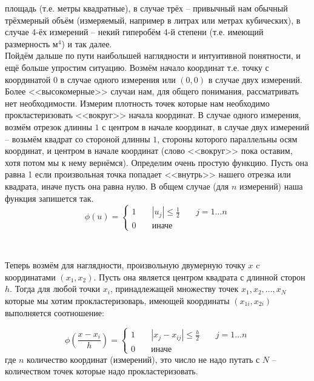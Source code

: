 \documentclass[11pt]{article}
\begin{document}
площадь (т.е. метры квадратные), в случае трёх -- привычный нам обычный
трёхмерный объём (измеряемый, например в литрах или метрах кубических),
в случае 4-ёх измерений -- некий гиперобём 4-й степени (т.е. имеющий
размерность ${\mbox{м}}^4$) и так далее. \\ Пойдём дальше
по пути наибольшей наглядности и интуитивной понятности, и ещё больше
упростим ситуацию. Возмём начало координат т.е. точку с координатой $0$
в случае одного измерения или $(0, 0)$ в случае двух измерений. Более
<<высокомерные>> случаи нам, для общего понимания, рассматривать
нет необходимости. Измерим плотность точек которые нам необходимо
прокластеризовать <<вокруг>> начала координат. В случае одного
измерения, возмём отрезок длинны $1$ с центром в начале координат, в
случае двух измерений -- возьмём квадрат со стороной длинны $1$, стороны
которого параллельны осям координат, и центром в начале координат (слово
<<вокруг>> пока оставим, хотя потом мы к нему вернёмся). Определим
очень простую функцию. Пусть она равна 1 если произвольная точка
попадает <<внутрь>> нашего отрезка или квадрата, иначе пусть она
равна нулю. В общем случае (для $n$ измерений) наша функция запишется
так.
$$
\phi(u) = \left\lbrace
            \begin{aligned}
            1 && \; |u_j| \le \frac{1}{2} && \; j = 1\ldots n \\
            0 && \; \mbox{иначе} &&
           \end{aligned}
          \right.
$$


    \begin{center}
    \end{center}
    { \hspace*{\fill} \\}
    
    Теперь возмём для наглядности, произвольную двумерную
точку $x$ c координатами $(x_1, x_2)$. Пусть она является центром
квадрата с длинной сторон $h$. Тогда для любой точки $x_i$,
принадлежащей множеству точек $x_1, x_2, \ldots , x_N$ которые мы хотим
прокластеризоварь, имеющей координаты $(x_{1i}, x_{2i})$ выполняется
соотношение:

$$
\phi\left(\frac{x - x_i}{h}\right) = \left\lbrace
            \begin{aligned}
            1 && \; |x_j - x_{ij}| \le \frac{h}{2} && \; j = 1\ldots n \\
            0 && \; \mbox{иначе} &&
           \end{aligned}
          \right.
$$
где $n$ количество координат (измерений), это число не надо путать с
$N$ -- количеством точек которые надо прокластеризовать.
\end{document}
